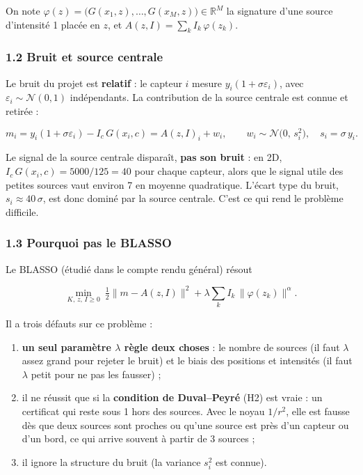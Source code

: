 \documentclass[
  french,
]{article}
\providecommand{\tightlist}{%
  \setlength{\itemsep}{0pt}\setlength{\parskip}{0pt}}
\begin{document}
On note
\(\varphi(z) = \big(G(x_1,z),\dots,G(x_M,z)\big)\in\mathbb{R}^M\) la
signature d'une source d'intensité 1 placée en \(z\), et
\(A(z, I) = \sum_k I_k\,\varphi(z_k)\).

\subsubsection{1.2 Bruit et source
centrale}\label{bruit-et-source-centrale}

Le bruit du projet est \textbf{relatif} : le capteur \(i\) mesure
\(y_i(1 + \sigma\varepsilon_i)\), avec
\(\varepsilon_i\sim\mathcal N(0,1)\) indépendants. La contribution de la
source centrale est connue et retirée :

\[
m_i = y_i(1 + \sigma\varepsilon_i) - I_c\,G(x_i, c)
    = A(z, I)_i + w_i,
\qquad w_i\sim\mathcal N\big(0,\,s_i^2\big),\quad s_i = \sigma\,y_i .
\]

Le signal de la source centrale disparaît, \textbf{pas son bruit} : en
2D, \(I_c\,G(x_i, c) = 5000/125 = 40\) pour chaque capteur, alors que le
signal utile des petites sources vaut environ 7 en moyenne quadratique.
L'écart type du bruit, \(s_i\approx 40\,\sigma\), est donc dominé par la
source centrale. C'est ce qui rend le problème difficile.

\subsubsection{1.3 Pourquoi pas le BLASSO}\label{pourquoi-pas-le-blasso}

Le BLASSO (étudié dans le compte rendu général) résout

\[
\min_{K,\,z,\,I\ge 0}\ \tfrac12\big\lVert m - A(z, I)\big\rVert^2
+ \lambda\sum_k I_k\,\lVert\varphi(z_k)\rVert^{\alpha} .
\]

Il a trois défauts sur ce problème :

\begin{enumerate}
\def\labelenumi{\arabic{enumi}.}
\tightlist
\item
  \textbf{un seul paramètre \(\lambda\) règle deux choses} : le nombre
  de sources (il faut \(\lambda\) assez grand pour rejeter le bruit) et
  le biais des positions et intensités (il faut \(\lambda\) petit pour
  ne pas les fausser) ;
\item
  il ne réussit que si la \textbf{condition de Duval--Peyré} (H2) est
  vraie : un certificat qui reste sous 1 hors des sources. Avec le noyau
  \(1/r^2\), elle est fausse dès que deux sources sont proches ou qu'une
  source est près d'un capteur ou d'un bord, ce qui arrive souvent à
  partir de 3 sources ;
\item
  il ignore la structure du bruit (la variance \(s_i^2\) est connue).
\end{enumerate}
\end{document}
